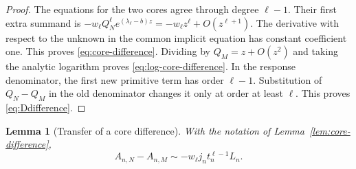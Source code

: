 \documentclass[11pt,a4paper]{article}
\numberwithin{equation}{section}
\newtheorem{lemma}[theorem]{Lemma}
\theoremstyle{definition}
\theoremstyle{remark}
\begin{document}
\begin{proof}
The equations for the two cores agree through degree $\ell-1$.
Their first extra summand is $-w_\ell Q_N^\ell
 e^{(\lambda_\ell-b)z}=-w_\ell z^\ell+O(z^{\ell+1})$.
The derivative with respect to the unknown in the common implicit equation
has constant coefficient one. This proves \eqref{eq:core-difference}.
Dividing by $Q_M=z+O(z^2)$ and taking the analytic logarithm proves
\eqref{eq:log-core-difference}. In the response denominator, the first
new primitive term has order $\ell-1$. Substitution of $Q_N-Q_M$ in the
old denominator changes it only at order at least $\ell$.
This proves \eqref{eq:Ddifference}.
\end{proof}

\begin{lemma}[Transfer of a core difference]
\label{lem:transfer-difference}
With the notation of Lemma~\ref{lem:core-difference},
\begin{equation}
 A_{n,N}-A_{n,M}
 \sim -w_\ell j_n t_n^{\ell-1}L_n.
 \label{eq:transfer-difference}
\end{equation}
\end{lemma}
\end{document}
